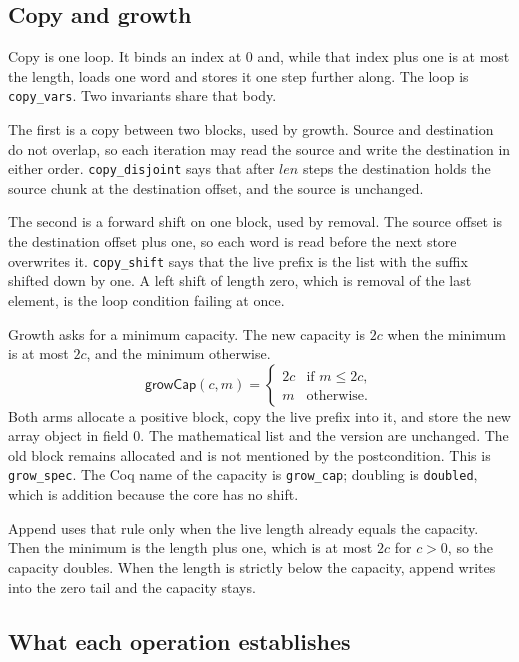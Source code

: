 \documentclass[11pt]{article}
\begin{document}
\subsection{Copy and growth}

Copy is one loop.
It binds an index at \(0\) and, while that index plus one is at most the length, loads one word and stores it one step further along.
The loop is \texttt{copy\_vars}.
Two invariants share that body.

The first is a copy between two blocks, used by growth.
Source and destination do not overlap, so each iteration may read the source and write the destination in either order.
\texttt{copy\_disjoint} says that after \(\mathit{len}\) steps the destination holds the source chunk at the destination offset, and the source is unchanged.

The second is a forward shift on one block, used by removal.
The source offset is the destination offset plus one, so each word is read before the next store overwrites it.
\texttt{copy\_shift} says that the live prefix is the list with the suffix shifted down by one.
A left shift of length zero, which is removal of the last element, is the loop condition failing at once.

Growth asks for a minimum capacity.
The new capacity is \(2c\) when the minimum is at most \(2c\), and the minimum otherwise.
\[
\mathsf{growCap}(c, m) =
\begin{cases}
2c & \text{if } m \le 2c,\\
m & \text{otherwise.}
\end{cases}
\]
Both arms allocate a positive block, copy the live prefix into it, and store the new array object in field \(0\).
The mathematical list and the version are unchanged.
The old block remains allocated and is not mentioned by the postcondition.
This is \texttt{grow\_spec}.
The Coq name of the capacity is \texttt{grow\_cap}; doubling is \texttt{doubled}, which is addition because the core has no shift.

Append uses that rule only when the live length already equals the capacity.
Then the minimum is the length plus one, which is at most \(2c\) for \(c > 0\), so the capacity doubles.
When the length is strictly below the capacity, append writes into the zero tail and the capacity stays.

\subsection{What each operation establishes}
\end{document}
